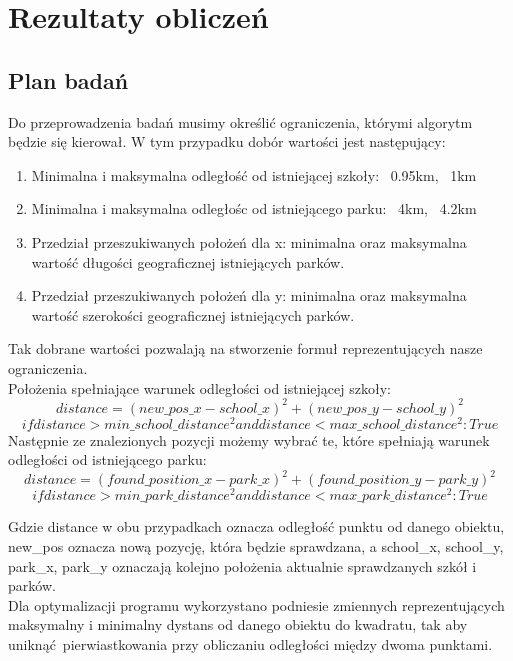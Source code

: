 \documentclass[10pt]{article}
\begin{document}
\section{Rezultaty obliczeń}

\subsection{Plan badań}
Do przeprowadzenia badań musimy określić ograniczenia, którymi algorytm będzie się kierował. W tym przypadku dobór wartości jest następujący:
\begin{enumerate}
    \item Minimalna i maksymalna odległość od istniejącej szkoły: ~0.95km, ~1km
    \item Minimalna i maksymalna odległośc od istniejącego parku: ~4km, ~4.2km
    \item Przedział przeszukiwanych położeń dla x: minimalna oraz maksymalna wartość długości geograficznej istniejących parków.
    \item Przedział przeszukiwanych położeń dla y: minimalna oraz maksymalna wartość szerokości geograficznej istniejących parków.
\end{enumerate}

Tak dobrane wartości pozwalają na stworzenie formuł reprezentujących nasze ograniczenia.\\
Położenia spełniające warunek odległości od istniejącej szkoły:
\[ distance = (new\_pos\_x - school\_x)^2 + (new\_pos\_y - school\_y)^2 \]
\[if distance > min\_school\_distance^2 and distance < max\_school\_distance^2: True\]
Następnie ze znalezionych pozycji możemy wybrać te, które spełniają warunek odległości od istniejącego parku:
\[distance = (found\_position\_x - park\_x)^2 + (found\_position\_y - park\_y)^2\]
\[if distance > min\_park\_distance^2 and distance < max\_park\_distance^2: True\]

Gdzie distance w obu przypadkach oznacza odległość punktu od danego obiektu, new\_pos oznacza nową pozycję, która będzie sprawdzana, a school\_x, school\_y, park\_x, park\_y oznaczają kolejno położenia aktualnie sprawdzanych szkół i parków.\\
Dla optymalizacji programu wykorzystano podniesie zmiennych reprezentujących maksymalny i minimalny dystans od danego obiektu do kwadratu, tak aby uniknąć pierwiastkowania przy obliczaniu odległości między dwoma punktami.
\newpage
\end{document}
